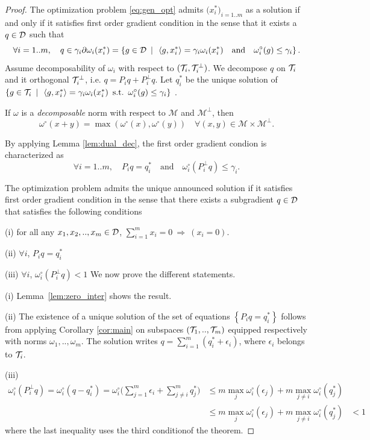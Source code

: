 \documentclass{article}
\begin{document}
\begin{proof}
The optimization problem \ref{eq:gen_opt} admits $\big(x_{i}^*\big)_{i=1..m}$ as a solution if and only if it satisfies first order gradient condition in the sense that it exists a $q\in\mathcal{D}$ such that
$$
\forall{i}=1..m, \quad q\in\gamma_{i}\partial\omega_{i}(x_i^*)=\left\lbrace g\in\mathcal{D}  \enspace|\enspace \left\langle g,x_i^* \right\rangle = \gamma_i\omega_{i}(x_i^*) \quad \text{and} \quad \omega_{i}^{\circ}(g)\leq \gamma_i  \right\rbrace.
$$
Assume decomposability of $\omega_i$ with respect to $(\mathcal{T}_i,\mathcal{T}_i^{\perp})$. We decompose $q$ on  $\mathcal{T}_i$ and it orthogonal $\mathcal{T}_i^{\perp}$, i.e. $q=P_i q+P_i^{\perp} q$. 
Let $q_i^*$ be the unique solution of $\left\lbrace g \in \mathcal{T}_i \enspace|\enspace \left\langle g,x_i^* \right\rangle = \gamma_i\omega_{i}(x_i^*) \enspace\text{s.t.}\enspace  \omega_{i}^{\circ}(g)\leq \gamma_i\right\rbrace$ . 
\begin{lemma}
\label{lem:dual_dec}
If $\omega$ is a \emph{decomposable} norm with respect to $\mathcal{M}$ and $\mathcal{M}^{\perp}$, then
$$
\omega^{\circ}(x+y)=\max(\omega^{\circ}(x),\omega^{\circ}(y))  \quad \forall (x,y)\in\mathcal{M}\times\mathcal{M}^{\perp}.
$$
\end{lemma}

By applying Lemma \ref{lem:dual_dec}, the first order gradient condion is characterized as 
$$
\forall{i}=1..m, \quad P_i q=q_i^* \quad \text{and} \quad \omega_i^\circ(P_i^{\perp} q)\leq \gamma_i.
$$

 The optimization problem admits the unique announced solution if it satisfies first order gradient condition in the sense that there exists a subgradient $q \in \mathcal{D}$ that satisfies the following conditions
\BET
\item[(i)] for all any $x_{1},x_{2},..,x_{m}\in \mathcal{D}$, $\sum_{i=1}^{m} x_{i}=0 \: \Rightarrow \: (x_{i}=0)$. 
\item[(ii)] $\forall i$, $P_i q = q_i^*$
\item[(iii)]$\forall i$, $\omega_{i}^{\circ}(P_i^{\perp} q)<1$
\EET
We now prove the different statements. 
\BET
\item[(i)]  Lemma~\ref{lem:zero_inter} shows the result. 
\item[(ii)]  The existence of a unique solution of the set of equations $\left\lbrace P_i q = q_i^* \right\rbrace$ follows from applying Corollary \ref{cor:main} on subspaces $\left(\mathcal{T}_1,..,\mathcal{T}_m\right)$ equipped respectively with norms $\omega_1,.., \omega_m$. The solution writes $q=\sum_{i=1}^m(q_i^*+\epsilon_i)$, where $\epsilon_i$ belongs to $\mathcal{T}_i$.
\item[(iii)]  
\begin{align*}
\omega_{i}^{\circ}(P_i^{\perp} q) = \omega_{i}^{\circ}(q-q_i^*) = \omega_{i}^{\circ}\big(\sum_{j=1}^m\epsilon_i + \sum_{j\neq i}^m q_j^*\big) 
&\leq m \max_j \omega_{i}^{\circ}(\epsilon_j) + m  \max_{j\neq i} \omega_{i}^{\circ}(q_j^*) \\
&\leq m \max_j \omega_{i}^{\circ}(\epsilon_j) + m  \max_{j\neq i} \omega_{i}^{\circ}(q_j^*)
& < 1 
\end{align*}
where the last inequality uses the third conditionof the theorem.
\EET
\end{proof}
\end{document}
